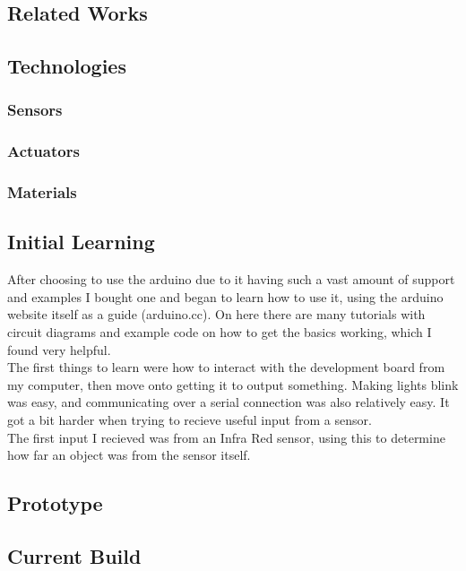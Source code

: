 \documentclass[11pt,fleqn,twoside]{article}
\begin{document}
\subsection{Related Works}

\subsection{Technologies}

\subsubsection{Sensors}

\subsubsection{Actuators}

\subsubsection{Materials}

\subsection{Initial Learning}
After choosing to use the arduino due to it having such a vast amount of support and examples I bought one and began to learn how to use it, using the arduino website itself as a guide (arduino.cc).  On here there are many tutorials with circuit diagrams and example code on how to get the basics working, which I found very helpful.
\\The first things to learn were how to interact with the development board from my computer, then move onto getting it to output something.  Making lights blink was easy, and communicating over a serial connection was also relatively easy.  It got a bit harder when trying to recieve useful input from a sensor.
\\The first input I recieved was from an Infra Red sensor, using this to determine how far an object was from the sensor itself.

\subsection{Prototype}


\subsection{Current Build}
\end{document}

